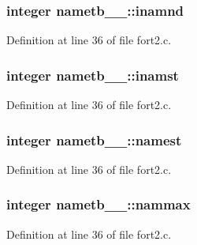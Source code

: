 \subsubsection[{\texorpdfstring{inamnd}{inamnd}}]{\setlength{\rightskip}{0pt plus 5cm}integer nametb\+\_\+\_\+\+::inamnd}\hypertarget{structnametb__1___ae0c921d7abd0a8f0695bbb016e595be3}{}\label{structnametb__1___ae0c921d7abd0a8f0695bbb016e595be3}


Definition at line 36 of file fort2.\+c.

\subsubsection[{\texorpdfstring{inamst}{inamst}}]{\setlength{\rightskip}{0pt plus 5cm}integer nametb\+\_\+\_\+\+::inamst}\hypertarget{structnametb__1___aa42b70d56c1d149ed2403c0e6144c574}{}\label{structnametb__1___aa42b70d56c1d149ed2403c0e6144c574}


Definition at line 36 of file fort2.\+c.

\subsubsection[{\texorpdfstring{namest}{namest}}]{\setlength{\rightskip}{0pt plus 5cm}integer nametb\+\_\+\_\+\+::namest}\hypertarget{structnametb__1___a77ec2951347275bc059f7da07eafc9fc}{}\label{structnametb__1___a77ec2951347275bc059f7da07eafc9fc}


Definition at line 36 of file fort2.\+c.

\subsubsection[{\texorpdfstring{nammax}{nammax}}]{\setlength{\rightskip}{0pt plus 5cm}integer nametb\+\_\+\_\+\+::nammax}\hypertarget{structnametb__1___aa2ff50da92ef183656ad7b78295b93dc}{}\label{structnametb__1___aa2ff50da92ef183656ad7b78295b93dc}


Definition at line 36 of file fort2.\+c.

